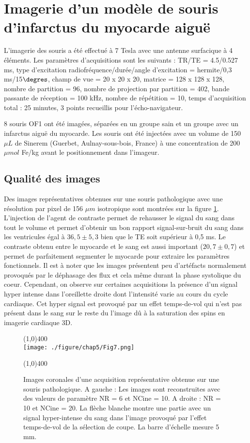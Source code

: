\section{Imagerie d'un modèle de souris d'infarctus du myocarde aiguë}

L'imagerie des souris a été effectué à 7 Tesla avec une antenne surfacique à 4 éléments. Les paramètres d'acquisitions sont les suivants :
TR/TE = 4.5/0.527 ms, type d'excitation radiofréquence/durée/angle d'excitation = hermite/0,3 ms/15$\degres$, champ de vue = 20 x 20 x 20, matrice = 128 x 128 x 128, nombre de partition = 96, nombre de projection par partition = 402, bande passante de réception = 100 kHz, nombre de répétition = 10, temps d'acquisition total : 25 minutes, 3 points recueillis pour l'écho-navigateur.

8 souris OF1 ont été imagées, séparées en un groupe sain et un groupe avec un infarctus aiguë du myocarde. Les souris ont été injectées avec un volume de 150 $\mu L$ de Sinerem (Guerbet, Aulnay-sous-bois, France) à une concentration de 200 $\mu mol$ Fe/kg avant le positionnement dans l'imageur.

\subsection{Qualité des images}

Des images représentatives obtenues sur une souris pathologique avec une résolution par pixel de 156 $\mu m$ isotropique sont montrées sur la figure \ref{fig:ImInfarct}. L'injection de l'agent de contraste permet de rehausser le signal du sang dans tout le volume et permet d'obtenir un bon rapport signal-sur-bruit du sang dans les ventricules égal à $36,5 \pm 5,3$ bien que le TE soit supérieur à 0,5 ms. Le contraste obtenu entre le myocarde et le sang est aussi important ($20,7 \pm 0,7$) et permet de parfaitement segmenter le myocarde pour extraire les paramètres fonctionnels. Il est à noter que les images présentent peu d'artéfacts normalement provoqués par le déphasage des flux et cela même durant la phase systolique du coeur. Cependant, on observe sur certaines acquisitions la présence d'un signal hyper intense dans l'oreillette droite dont l'intensité varie au cours du cycle cardiaque. Cet hyper signal est provoqué par un effet temps-de-vol qui n'est pas présent dans le sang sur le reste du l'image dû à la saturation des spins en imagerie cardiaque 3D.

\begin{figure}[H]
\centering
\line(1,0){400} \\
\texttt{[image: ./figure/chap5/Fig7.png]}
\caption[Images obtenus sur une souris pathologique]{\label{fig:ImInfarct} Images coronales d'une acquisition représentative obtenue sur une souris pathologique. A gauche : Les images sont reconstruites avec des valeurs de paramètre NR = 6 et NCine = 10. A droite : NR = 10 et NCine = 20. La flèche blanche montre une partie avec un signal hyper-intense du sang dans l'image provoqué par l'effet temps-de-vol de la sélection de coupe. La barre d'échelle mesure 5 mm.}
\line(1,0){400} \\ 
\end{figure}

